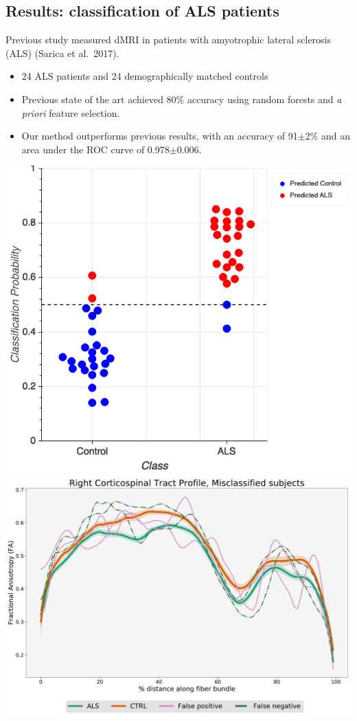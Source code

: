 \documentclass[a0, landscape]{a0poster}
\newenvironment{Figure}
  {\par\medskip\noindent\minipage{\linewidth}}
  {\endminipage\par\medskip}
\begin{document}
\begin{multicols}{3}
\vspace{-1.25em}
\section*{Results: classification of ALS patients}
\noindent Previous study measured dMRI in patients with amyotrophic lateral sclerosis (ALS) (Sarica et al.~2017).
\begin{itemize}
    \item 24 ALS patients and 24 demographically matched controls
    \item Previous state of the art achieved 80\% accuracy using random forests and \emph{a priori} feature selection.
    \item Our method outperforms previous results, with an accuracy of 91$\pm$2\% and an area under the ROC curve of 0.978$\pm$0.006.
\end{itemize}

\begin{Figure}
    \centering
    \includegraphics[width=0.315\linewidth, valign=m]{classification_probs.png}
    \includegraphics[width=0.475\linewidth, valign=m]{classification_subjects_profiles.pdf}
\end{Figure}


\end{multicols}
\end{document}
